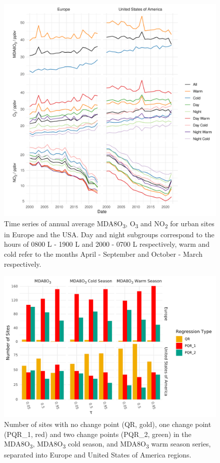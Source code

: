 \documentclass[journal abbreviation, manuscript]{copernicus}
\begin{document}
\begin{figure}[p]
\includegraphics[width=12cm]{figures/paper_figures/f01_overview.pdf}
\caption{Time series of annual average MDA8O\textsubscript{3}, O\textsubscript{3} and NO\textsubscript{2} for urban sites in Europe and the USA. Day and night subgroups correspond to the hours of 0800 L - 1900 L and 2000 - 0700 L respectively, warm and cold refer to the months April - September and October - March respectively.}
\label{fig:conc_plot}
\end{figure}
\clearpage

\begin{figure}[p]
\includegraphics[width=12cm]{figures/paper_figures/f02_regression_type_bars_o3.pdf}
\caption{Number of sites with no change point (QR, gold), one change point (PQR\_1, red) and two change points (PQR\_2, green) in the MDA8O\textsubscript{3}, MDA8O\textsubscript{3} cold season, and MDA8O\textsubscript{3} warm season series, separated into Europe and United States of America regions.}
\label{fig:regression_type}
\end{figure}
\clearpage
\end{document}
